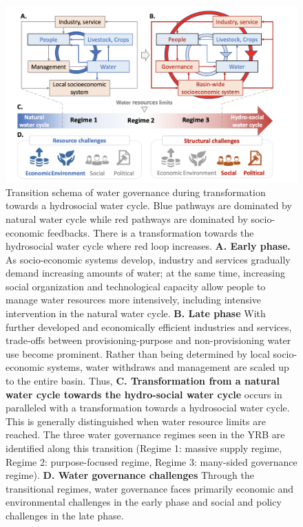 \documentclass[9pt, twocolumn, twoside, lineno]{pnas-new}
\begin{document}
\begin{figure}[htbp!]
	\centering
	\includegraphics[width=0.8\linewidth]{../../figures/main/transition.png}
	\caption{
		Transition schema of water governance during transformation towards a hydrosocial water cycle. Blue pathways are dominated by natural water cycle while red pathways are dominated by socio-economic feedbacks. There is a transformation towards the hydrosocial water cycle where red loop increases.
		\textbf{A. Early phase.} As socio-economic systems develop, industry and services gradually demand increasing amounts of water; at the same time, increasing social organization and technological capacity allow people to manage water resources more intensively, including intensive intervention in the natural water cycle. 
		\textbf{B. Late phase} With further developed and economically efficient industries and services, trade-offs between provisioning-purpose and non-provisioning water use become prominent. Rather than being determined by local socio-economic systems, water withdraws and management are scaled up to the entire basin. 
		Thus, \textbf{C. Transformation from a natural water cycle towards the hydro-social water cycle} occurs in paralleled with a transformation towards a hydrosocial water cycle. This is generally distinguished when water resource limits are reached. The three water governance regimes seen in the YRB are identified along this transition (Regime 1: massive supply regime, Regime 2: purpose-focused regime, Regime 3: many-sided governance regime).
		\textbf{D. Water governance challenges} Through the transitional regimes, water governance faces primarily economic and environmental challenges in the early phase and social and policy challenges in the late phase.
	}
	\label{fig:summary}
\end{figure}
\end{document}
